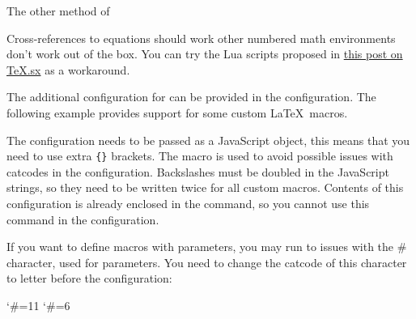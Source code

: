 The other method of 

Cross-references to equations should work other numbered math environments
don't work out of the box. You can try the Lua scripts proposed in 
\href{https://tex.stackexchange.com/a/597913/2891}{this post on TeX.sx} as
a workaround.

The additional configuration for  can be provided in the
 configuration.
The following example provides support for some custom \LaTeX\ macros.

\begin{texsource}

\EndPreamble

\end{texsource}


The configuration needs to be passed as a JavaScript object, this means that
you need to use extra \verb|{}| brackets.
The \texcommand{\detokenize} macro is used to avoid possible issues with catcodes
in the configuration. Backslashes must be doubled in the
JavaScript strings, so they need to be written twice for all custom macros.
Contents of this configuration is already enclosed in the
\texcommand{\HCode} command, so you cannot use this command in the configuration.

If you want to define macros with parameters, you may run to issues with the \# character, used for parameters.
You need to change the catcode of this character to letter before the  configuration:

\begin{texsource}
\catcode`\#=11
\catcode`\#=6

\EndPreamble
\end{texsource}

